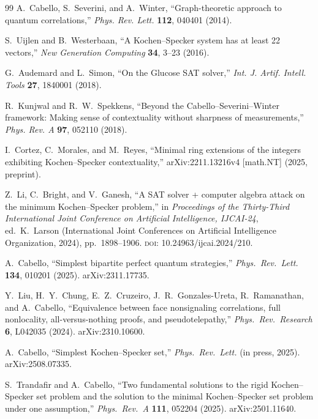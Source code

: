 \documentclass[12pt,a4paper]{article}
\begin{document}
\begin{thebibliography}{99}
A.~Cabello, S.~Severini, and A.~Winter,
``Graph-theoretic approach to quantum correlations,''
\textit{Phys. Rev. Lett.} \textbf{112}, 040401 (2014).

S.~Uijlen and B.~Westerbaan,
``A Kochen--Specker system has at least 22 vectors,''
\textit{New Generation Computing} \textbf{34}, 3--23 (2016).

G.~Audemard and L.~Simon,
``On the Glucose SAT solver,''
\textit{Int. J. Artif. Intell. Tools} \textbf{27}, 1840001 (2018).

R.~Kunjwal and R.~W.~Spekkens,
``Beyond the Cabello--Severini--Winter framework: Making sense of contextuality without sharpness of measurements,''
\textit{Phys. Rev. A} \textbf{97}, 052110 (2018).

I.~Cortez, C.~Morales, and M.~Reyes,
``Minimal ring extensions of the integers exhibiting Kochen--Specker contextuality,''
arXiv:2211.13216v4 [math.NT] (2025, preprint).

Z.~Li, C.~Bright, and V.~Ganesh,
``A {SAT} solver + computer algebra attack on the minimum {Kochen}--{Specker} problem,''
in \textit{Proceedings of the Thirty-Third International Joint Conference on Artificial Intelligence, {IJCAI-24}},
ed.\ K.~Larson (International Joint Conferences on Artificial Intelligence Organization, 2024),
pp.~1898--1906.
\textsc{doi}: 10.24963/ijcai.2024/210.

A.~Cabello,
``Simplest bipartite perfect quantum strategies,''
\textit{Phys.\ Rev.\ Lett.} \textbf{134}, 010201 (2025).
arXiv:2311.17735.

Y.~Liu, H.~Y.~Chung, E.~Z.~Cruzeiro, J.~R.~Gonzales-Ureta, R.~Ramanathan, and A.~Cabello,
``Equivalence between face nonsignaling correlations, full nonlocality, all-versus-nothing proofs, and pseudotelepathy,''
\textit{Phys.\ Rev.\ Research} \textbf{6}, L042035 (2024).
arXiv:2310.10600.

A.~Cabello,
``Simplest Kochen--Specker set,''
\textit{Phys.\ Rev.\ Lett.} (in press, 2025).
arXiv:2508.07335.

S.~Trandafir and A.~Cabello,
``Two fundamental solutions to the rigid Kochen--Specker set problem and the solution to the minimal Kochen--Specker set problem under one assumption,''
\textit{Phys.\ Rev.\ A} \textbf{111}, 052204 (2025).
arXiv:2501.11640.


\end{thebibliography}
\end{document}
